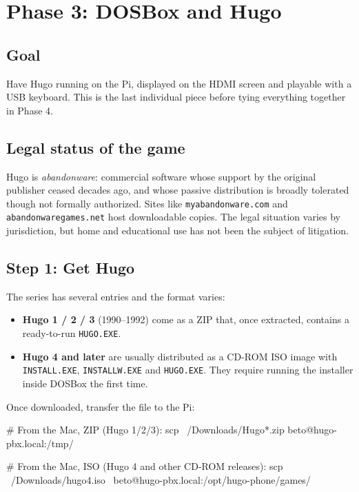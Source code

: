 \chapter{Phase 3: DOSBox and Hugo}

\section{Goal}

Have Hugo running on the Pi, displayed on the HDMI screen and playable with a USB keyboard. This is the last individual piece before tying everything together in Phase 4.

\section{Legal status of the game}

Hugo is \emph{abandonware}: commercial software whose support by the original publisher ceased decades ago, and whose passive distribution is broadly tolerated though not formally authorized. Sites like \texttt{myabandonware.com} and \texttt{abandonwaregames.net} host downloadable copies. The legal situation varies by jurisdiction, but home and educational use has not been the subject of litigation.

\section{Step 1: Get Hugo}

The series has several entries and the format varies:

\begin{itemize}
  \item \textbf{Hugo 1 / 2 / 3} (1990--1992) come as a ZIP that, once extracted, contains a ready-to-run \texttt{HUGO.EXE}.
  \item \textbf{Hugo 4 and later} are usually distributed as a CD-ROM ISO image with \texttt{INSTALL.EXE}, \texttt{INSTALLW.EXE} and \texttt{HUGO.EXE}. They require running the installer inside DOSBox the first time.
\end{itemize}

Once downloaded, transfer the file to the Pi:

\begin{shellcode}
# From the Mac, ZIP (Hugo 1/2/3):
scp ~/Downloads/Hugo*.zip beto@hugo-pbx.local:/tmp/

# From the Mac, ISO (Hugo 4 and other CD-ROM releases):
scp ~/Downloads/hugo4.iso \
  beto@hugo-pbx.local:/opt/hugo-phone/games/
\end{shellcode}

